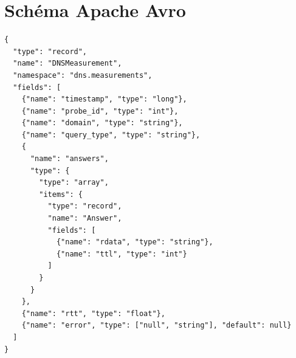 \section{Schéma Apache Avro}

\begin{lstlisting}[caption=Schéma Avro pour les résultats DNS]
{
  "type": "record",
  "name": "DNSMeasurement",
  "namespace": "dns.measurements",
  "fields": [
    {"name": "timestamp", "type": "long"},
    {"name": "probe_id", "type": "int"},
    {"name": "domain", "type": "string"},
    {"name": "query_type", "type": "string"},
    {
      "name": "answers",
      "type": {
        "type": "array",
        "items": {
          "type": "record",
          "name": "Answer",
          "fields": [
            {"name": "rdata", "type": "string"},
            {"name": "ttl", "type": "int"}
          ]
        }
      }
    },
    {"name": "rtt", "type": "float"},
    {"name": "error", "type": ["null", "string"], "default": null}
  ]
}
\end{lstlisting}